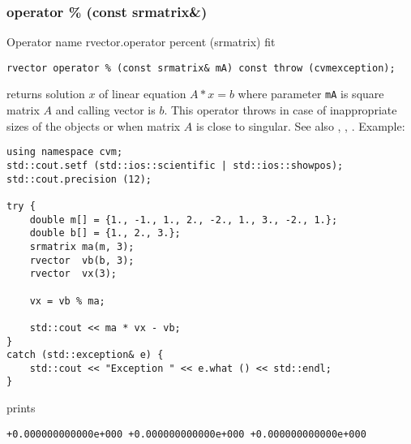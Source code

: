 \subsubsection{operator \% (const srmatrix\&)}
Operator%
\pdfdest name {rvector.operator percent (srmatrix)} fit
\begin{verbatim}
rvector operator % (const srmatrix& mA) const throw (cvmexception);
\end{verbatim}
returns solution $x$ of linear equation
$A*x=b$ where parameter \verb"mA" is  square matrix $A$
and calling vector is $b$.
This operator throws 
in case of inappropriate sizes
of the objects or when  matrix $A$ is close to singular.
See also , , .
Example:
\begin{Verbatim}
using namespace cvm;
std::cout.setf (std::ios::scientific | std::ios::showpos);
std::cout.precision (12);

try {
    double m[] = {1., -1., 1., 2., -2., 1., 3., -2., 1.};
    double b[] = {1., 2., 3.};
    srmatrix ma(m, 3);
    rvector  vb(b, 3);
    rvector  vx(3);

    vx = vb % ma;

    std::cout << ma * vx - vb;
}
catch (std::exception& e) {
    std::cout << "Exception " << e.what () << std::endl;
}
\end{Verbatim}
prints
\begin{Verbatim}
+0.000000000000e+000 +0.000000000000e+000 +0.000000000000e+000
\end{Verbatim}
\newpage



